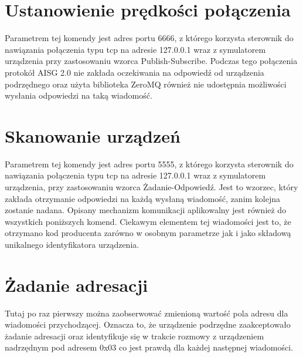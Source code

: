     \section{Ustanowienie prędkości połączenia}
    Parametrem tej komendy jest adres portu 6666, z którego korzysta sterownik
    do nawiązania połączenia typu tcp na adresie 127.0.0.1 wraz z symulatorem urządzenia
    przy zastosowaniu wzorca Publish-Subscribe. Podczas tego połączenia protokół AISG 2.0 
    nie zakłada oczekiwania na odpowiedź od urządzenia podrzędnego oraz użyta biblioteka
    ZeroMQ również nie udostępnia możliwości wysłania odpowiedzi na taką wiadomość.

    \section{Skanowanie urządzeń}
    Parametrem tej komendy jest adres portu 5555, z którego korzysta sterownik
    do nawiązania połączenia typu tcp na adresie 127.0.0.1 wraz z symulatorem urządzenia,
    przy zastosowaniu wzorca Żadanie-Odpowiedź. Jest to wzorzec, który zakłada otrzymanie 
    odpowiedzi na każdą wysłaną wiadomość, zanim kolejna zostanie nadana. Opisany mechanizm komunikacji
    aplikowalny jest również do wszystkich poniższych komend.
    Ciekawym elementem tej wiadomości jest to, że otrzymano kod producenta zarówno
    w osobnym parametrze jak i jako składową unikalnego identyfikatora urządzenia.

    \section{Żadanie adresacji}
    Tutaj po raz pierwszy można zaobserwować zmienioną wartość pola adresu dla wiadomości
    przychodzącej. Oznacza to, że urządzenie podrzędne zaakceptowało żadanie adresacji 
    oraz identyfikuje się w trakcie rozmowy z urządzeniem nadrzędnym pod adresem 0x03 co
    jest prawdą dla każdej następnej wiadomości.
 
